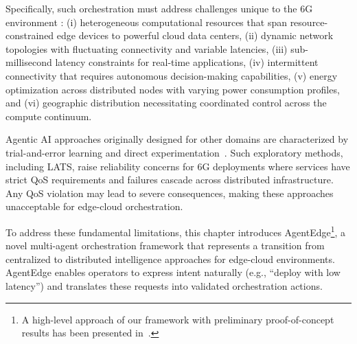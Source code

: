 Specifically, such orchestration must address challenges unique to the \ac{6G} environment \cite{struggle_with_real_time_adaptation2025, NISA2025}: (i) heterogeneous computational resources that span resource-constrained edge devices to powerful cloud data centers, (ii) dynamic network topologies with fluctuating connectivity and variable latencies, (iii) sub-millisecond latency constraints for real-time applications, (iv) intermittent connectivity that requires autonomous decision-making capabilities, (v) energy optimization across distributed nodes with varying power consumption profiles, and (vi) geographic distribution necessitating coordinated control across the compute continuum. \par

Agentic \ac{AI} approaches originally designed for other domains are characterized by trial-and-error learning and direct experimentation~\cite{yao2023react, LATS}. Such exploratory methods, including \ac{LATS}, raise reliability concerns for \ac{6G} deployments where services have strict \ac{QoS} requirements and failures cascade across distributed infrastructure. Any \ac{QoS} violation may lead to severe consequences, making these approaches unacceptable for edge-cloud orchestration.

To address these fundamental limitations, this chapter introduces \ac{AgentEdge}\footnote{A high-level approach of our framework with preliminary proof-of-concept results has been presented in~\cite{gort2025agentedge}.}, a novel multi-agent orchestration framework that represents a transition from centralized to distributed intelligence approaches for edge-cloud environments. \ac{AgentEdge} enables operators to express intent naturally (e.g., ``deploy with low latency'') and translates these requests into validated orchestration actions.

